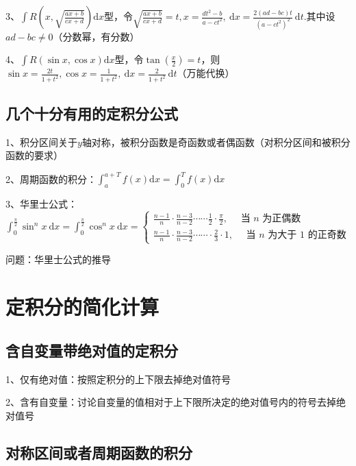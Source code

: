 3、$\int R\left(x, \sqrt{\frac{a x+b}{c x+d}}\right) \mathrm{d} x$型，令$\sqrt{\frac{a x+b}{c x+d}}=t, x=\frac{d t^{2}-b}{a-c t^{2}}, \mathrm{~d} x=\frac{2(a d-b c) t}{\left(a-c t^{2}\right)^{2}} \mathrm{~d} t .$其中设$a d-b c \neq 0$（分数幂，有分数）

4、$\int R(\sin x, \cos x) \mathrm{d} x$型，令$\tan({\frac{x}{2}})=t$，则$\sin x=\frac{2 t}{1+t^{2}}, \cos x=\frac{1}{1+t^{2}}, \mathrm{~d} x=\frac{2}{1+t^{2}} \mathrm{~d} t$（万能代换）



\subsection{几个十分有用的定积分公式}

1、积分区间关于$y$轴对称，被积分函数是奇函数或者偶函数（对积分区间和被积分函数的要求）

2、周期函数的积分：$\int_{a}^{a+T} f(x) \mathrm{d} x=\int_{0}^{T} f(x) \mathrm{d} x$

3、华里士公式：$\int_{0}^{\frac{\pi}{2}} \sin ^{n} x \mathrm{~d} x=\int_{0}^{\frac{\pi}{2}} \cos ^{n} x \mathrm{~d} x=\left\{\begin{array}{l}\frac{n-1}{n} \cdot \frac{n-3}{n-2} \cdots \cdots \frac{1}{2} \cdot \frac{\pi}{2}, \quad \text { 当 } n \text { 为正偶数 } \\\frac{n-1}{n} \cdot \frac{n-3}{n-2} \cdots \cdots \cdot \frac{2}{3} \cdot 1, \quad \text { 当 } n \text { 为大于 } 1 \text { 的正奇数 }\end{array}\right.$

问题：华里士公式的推导

\section{定积分的简化计算}



\subsection{含自变量带绝对值的定积分}

1、仅有绝对值：按照定积分的上下限去掉绝对值符号

2、含有自变量：讨论自变量的值相对于上下限所决定的绝对值号内的符号去掉绝对值号



\subsection{对称区间或者周期函数的积分}


